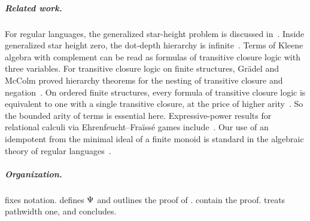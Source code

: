 \subparagraph*{Related work.}
For regular languages, the generalized star-height problem is discussed in~\cite{pinResultsGeneralizedStarheight1992}.
Inside generalized star height zero, the dot-depth hierarchy is infinite~\cite{brzozowskiDotdepthHierarchyStarfree1978,thomasConcatenationGameDotdepth1987}.
Terms of Kleene algebra with complement can be read as formulas of transitive closure logic with three variables.
For transitive closure logic on finite structures, Gr\"adel and McColm proved hierarchy theorems for the nesting of transitive closure and negation~\cite{gradelHierarchiesTransitiveClosure1996}.
On ordered finite structures, every formula of transitive closure logic is equivalent to one with a single transitive closure, at the price of higher arity~\cite{immermanLanguagesThatCapture1987}.
So the bounded arity of terms is essential here.
Expressive-power results for relational calculi via Ehrenfeucht--Fra\"iss\'e games include~\cite{nakamuraExpressivePowerSuccinctness2022}.
Our use of an idempotent from the minimal ideal of a finite monoid is standard in the algebraic theory of regular languages~\cite{pinVarietiesFormalLanguages1986}.

\subparagraph*{Organization.}
 fixes notation.
 defines $\Psi$ and outlines the proof of .
 contain the proof.
 treats pathwidth one, and  concludes.

